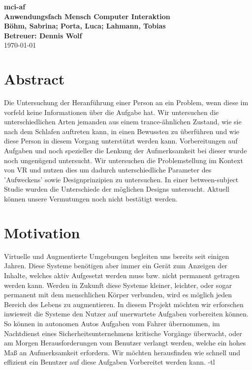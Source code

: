\documentclass[a4paper, 11pt]{article}
\newcommand{\projectName}{mci-af}
\begin{document}
\begin{center}
	\textbf{\LARGE{\projectName}}\\
    \textbf{\large{Anwendungsfach Mensch Computer Interaktion}}\\
	\vspace{7mm}
    \textbf{\large{Böhm, Sabrina; Porta, Luca; Lahmann, Tobias}}\\
	\textbf{\large{Betreuer: Dennis Wolf}}\\
	\today
\end{center}

\section*{Abstract}
Die Untersuchung der Heranführung einer Person an ein Problem, wenn diese im vorfeld keine Informationen über die Aufgabe hat. %
Wir untersuchen die unterschiedlichen Arten jemanden aus einem trance-ähnlichen Zustand, wie sie nach dem Schlafen auftreten kann, in einen Bewussten zu überführen und wie diese Person in diesem Vorgang unterstützt werden kann. %
Vorbereitungen auf Aufgaben und noch spezieller die Lenkung der Aufmerksamkeit bei dieser wurde noch ungenügend untersucht. %
Wir untersuchen die Problemstellung im Kontext von VR und nutzen dies um dadurch unterschiedliche Parameter des 'Aufweckens' sowie Designprinzipien zu untersuchen. %
In einer between-subject Studie wurden die Unterschiede der möglichen Designs untersucht. %
Aktuell können unsere Vermutungen noch nicht bestätigt werden. %

\section*{Motivation}
Virtuelle und Augmentierte Umgebungen begleiten uns bereits seit einigen Jahren. Diese Systeme benötigen aber immer ein Gerät zum Anzeigen der Inhalte, welches aktiv Aufgesetzt werden muss bzw. nicht permanent getragen werden kann. Werden in Zukunft diese Systeme kleiner, leichter, oder sogar permanent mit dem menschlichen Körper verbunden, wird es möglich jeden Bereich des Lebens zu augmentieren. In diesem Projekt möchten wir erforschen inwieweit die Systeme den Nutzer auf unerwartete Aufgaben vorbereiten können. So können in autonomen Autos Aufgaben vom Fahrer übernommen, im Nachtdienst eines Sicherheitsunternehmens kritische Vorgänge überwacht, oder am Morgen Herausforderungen vom Benutzer verlangt werden, welche ein hohes Maß an Aufmerksamkeit erfordern. Wir möchten herausfinden wie schnell und effizient ein Benutzer auf diese Aufgaben Vorbereitet werden kann. -tl
\end{document}
